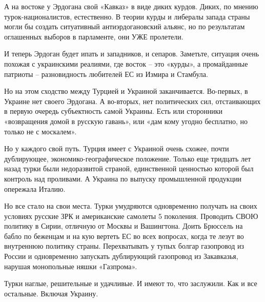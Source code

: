 А на востоке у Эрдогана свой «Кавказ» в виде диких курдов. Диких, по мнению
турок-националистов, естественно. В теории курды и либералы запада страны могли
бы создать ситуативный антиэрдогановский альянс, но по результатам оглашенных
выборов в парламенте, они УЖЕ пролетели.

И теперь Эрдоган будет ипать и западников, и сепаров. Заметьте, ситуация очень
похожая с украинскими реалиями, где восток – это «курды», а промайданные
патриоты – разновидность любителей ЕС из Измира и Стамбула.

Но на этом сходство между Турцией и Украиной заканчивается. Во-первых, в
Украине нет своего Эрдогана. А во-вторых, нет политических сил, отстаивающих в
первую очередь субъектность самой Украины. Есть или сторонники «возвращения
домой в русскую гавань», или «дам кому угодно бесплатно, но только не с
москалем».

Но у каждого свой путь. Турция имеет с Украиной очень схожее, почти
дублирующее, экономико-географическое положение. Только еще тридцать лет назад
турки были недоразвитой страной, единственной ценностью которой был контроль
над проливами. А Украина по выпуску промышленной продукции опережала Италию.

Но все стало на свои места. Турки умудряются одновременно получать на своих
условиях русские ЗРК и американские самолеты 5 поколения. Проводить СВОЮ
политику в Сирии, отличную от Москвы и Вашингтона. Доить Брюссель на бабло по
беженцам и на кую вертеть ЕС во всех вопросах, когда те лезут во внутреннюю
политику страны. Перехватывать у тупых болгар газопровод из России и
одновременно запускать дублирующий газопровод из Закавказья, нарушая
монопольные няшки «Газпрома».

Турки наглые, решительные и удачливые. И имеют то, что заслужили. Как и все
остальные. Включая Украину.


